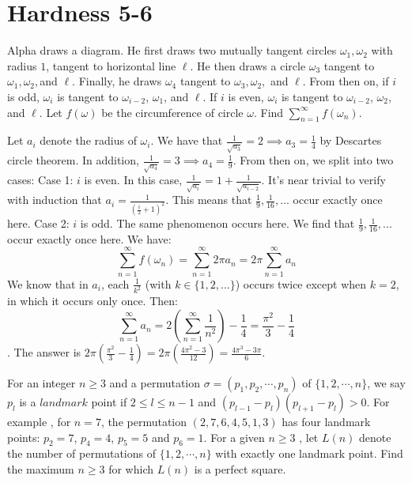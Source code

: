 \documentclass[11pt]{scrartcl}
\begin{document}
\section{Hardness 5-6}
\begin{example}
  Alpha draws a diagram. He first draws two mutually tangent circles $\omega_1, \omega_2$ with radius $1$, tangent to horizontal line $\ell$. He then draws a circle $\omega_3$ tangent to $\omega_1, \omega_2, $and $\ell$. Finally, he draws $\omega_4$ tangent to $\omega_3, \omega_2,$ and $\ell$. From then on, if $i$ is odd, $\omega_i$ is tangent to $\omega_{i-2}$, $\omega_1$, and $\ell$. If $i$ is even, $\omega_i$ is tangent to $\omega_{i-2}$, $\omega_2$, and $\ell$. Let $f(\omega)$ be the circumference of circle $\omega$. Find $\sum_{n=1}^{\infty}f(\omega_n)$.
\end{example}
\begin{soln}
  Let $a_i$ denote the radius of $\omega_i$. We have that $\frac{1}{\sqrt{a_3}}=2\implies a_3=\frac{1}{4}$ by Descartes circle theorem. In addition, $\frac{1}{\sqrt{a_4}}=3\implies a_4=\frac{1}{9}$. From then on, we split into two cases:
\newline
Case 1: $i$ is even. In this case, $\frac{1}{\sqrt{a_i}}=1+\frac{1}{\sqrt{a_{i-2}}}$. It's near trivial to verify with induction that $a_i=\frac{1}{\left(\frac{i}{2}+1\right)^2}$. This means that $\frac{1}{9}, \frac{1}{16}, ...$ occur exactly once here.
\newline
Case 2: $i$ is odd. The same phenomenon occurs here. We find that $\frac{1}{9}, \frac{1}{16}, ...$ occur exactly once here.
\newline
We have:
$$\sum_{n=1}^{\infty}f(\omega_n)=\sum_{n=1}^{\infty}2\pi a_n=2\pi \sum_{n=1}^{\infty}a_n$$
\newline
We know that in $a_i$, each $\frac{1}{k^2}$ (with $k\in \{1,2,...\}$) occurs twice except when $k=2$, in which it occurs only once. Then:
$$\sum_{n=1}^{\infty}a_n=2\left(\sum_{n=1}^{\infty}\frac{1}{n^2}\right)-\frac{1}{4}=\frac{\pi^2}{3}-\frac{1}{4}$$.
The answer is $2\pi \left(\frac{\pi^2}{3}-\frac{1}{4}\right)=2\pi\left(\frac{4\pi^2-3}{12}\right)=\frac{4\pi^3-3\pi}{6}$.
\end{soln}
\begin{example}
  [IOQM 2022-23 P20]
  For an integer $n\ge 3$ and a permutation $\sigma=(p_{1},p_{2},\cdots ,p_{n})$ of $\{1,2,\cdots , n\}$, we say $p_{l}$ is a $landmark$ point if $2\le l\le n-1$ and $(p_{l-1}-p_{l})(p_{l+1}-p_{l})>0$. For example , for $n=7$,
the permutation $(2,7,6,4,5,1,3)$ has four landmark points: $p_{2}=7$, $p_{4}=4$, $p_{5}=5$ and $p_{6}=1$. For a given $n\ge 3$ , let $L(n)$ denote the number of permutations of $\{1,2,\cdots ,n\}$ with exactly one landmark point. Find the maximum $n\ge 3$ for which $L(n)$ is a perfect square.
\end{example}
\end{document}
